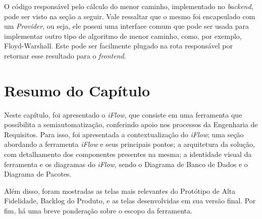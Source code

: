 \begin{enumerate}
    O código responsável pelo cálculo do menor caminho, implementado no \textit{backend}, pode ser visto na seção a seguir. Vale ressaltar que o mesmo foi encapsulado com um \textit{Provider}, ou seja, ele possui uma interface comum que pode ser usada para implementar outro tipo de algoritmo de menor caminho, como, por exemplo, Floyd-Warshall. Este pode ser facilmente plugado na rota responsável por retornar esse resultado para o \textit{frontend}.
    
    

\end{enumerate}

\section{Resumo do Capítulo}

\label{sec:resumo_proposta}
Neste capítulo, foi apresentado o \textit{iFlow}, que consiste em uma ferramenta que possibilita a semiautomatização, conferindo apoio nos processos da Engenharia de Requisitos. Para isso, foi apresentada a contextualização do \textit{iFlow}; uma seção abordando a ferramenta \textit{iFlow} e seus principais pontos; a arquitetura da solução, com detalhamento dos componentes presentes na mesma; a identidade visual da ferramenta e os diagramas do \textit{iFlow}, sendo o Diagrama de Banco de Dados e o Diagrama de Pacotes.

Além disso, foram mostradas as telas mais relevantes do Protótipo de Alta Fidelidade, Backlog do Produto, e as telas desenvolvidas em sua versão final. Por fim, há uma breve ponderação sobre o escopo da ferramenta.
